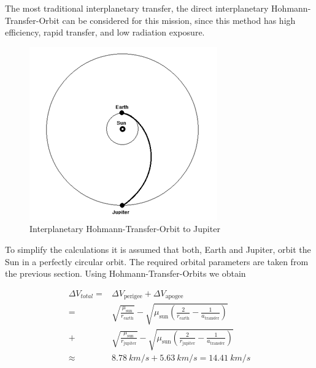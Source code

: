 

The most traditional interplanetary transfer, the direct
interplanetary Hohmann-Transfer-Orbit can be considered for this
mission, since this method has high efficiency, rapid transfer, and
low radiation exposure.\cite{Wertz2011SpaceMissionEng}

\begin{figure}[h]
  \includegraphics[width=\textwidth]{Hohmann-Orbit}
  \caption{Interplanetary Hohmann-Transfer-Orbit to Jupiter}
\end{figure}

To simplify the calculations it is assumed that both, Earth and
Jupiter, orbit the Sun in a perfectly circular orbit.  The required
orbital parameters are taken from the previous section.  Using
Hohmann-Transfer-Orbits we obtain

\begin{align*}
  \Delta V_{total} = {} &
  \Delta V_{\mathrm{perigee}}
  + \Delta V_{\mathrm{apogee}} \\
  = {} & \sqrt{\frac{\mu_{\mathrm{sun}}}{r_{\mathrm{earth}}}}
  - \sqrt{\mu_{\mathrm{sun}} \left(\frac{2}{r_{\mathrm{earth}}}
    - \frac{1}{a_{\mathrm{transfer}}}\right)} \\
  + & \sqrt{\frac{\mu_{\mathrm{sun}}}{r_{\mathrm{jupiter}}}}
  - \sqrt{\mu_{\mathrm{sun}}\left(\frac{2}{r_{\mathrm{jupiter}}}
    - \frac{1}{a_{\mathrm{transfer}}}\right)} \\
  \approx {} & \SI{8.78}{km/s} + \SI{5.63}{km/s} = \SI{14.41}{km/s} \\
\end{align*}

